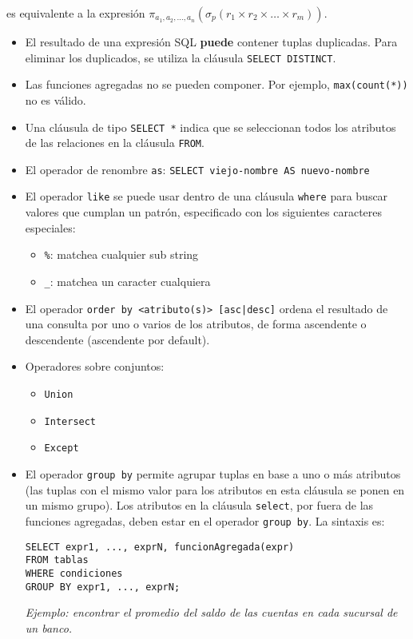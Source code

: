 \documentclass[a4paper, twoside]{article}
\begin{document}
es equivalente a la expresión $\pi_{a_{1},a_{2},\dots,a_{n}}\left(\sigma_{p}\left(r_{1}\times r_{2}\times\dots\times r_{m}\right)\right)$.
\begin{itemize}
	\item El resultado de una expresión SQL \textbf{puede} contener tuplas duplicadas. Para eliminar los duplicados, se utiliza la cláusula \texttt{SELECT DISTINCT}.
	\item Las funciones agregadas no se pueden componer. Por ejemplo, \texttt{max(count({*}))} no es válido.
	\item Una cláusula de tipo \texttt{SELECT {*}} indica que se seleccionan todos los atributos de las relaciones en la cláusula \texttt{FROM}.
	\item El operador de renombre \texttt{as}: \texttt{SELECT viejo-nombre AS nuevo-nombre}
	\item El operador \texttt{like} se puede usar dentro de una cláusula \texttt{where} para buscar valores que cumplan un patrón, especificado con los siguientes caracteres especiales: 
	\begin{itemize}
		\item \texttt{\%}: matchea cualquier sub string
		\item \texttt{\_}: matchea un caracter cualquiera
	\end{itemize}
	\item El operador \texttt{order by <atributo(s)> {[}asc|desc{]}} ordena el resultado de una consulta por uno o varios de los atributos, de forma ascendente o descendente (ascendente por default).
	\item Operadores sobre conjuntos:
	\begin{itemize}
		\item \texttt{Union}
		\item \texttt{Intersect}
		\item \texttt{Except}
	\end{itemize}
	\item El operador \texttt{group by} permite agrupar tuplas en base a uno o más atributos (las tuplas con el mismo valor para los atributos en esta cláusula se ponen en un mismo grupo). Los atributos en la cláusula \texttt{select}, por fuera de las funciones agregadas, deben estar en el operador \texttt{group by}. La sintaxis es:
	\begin{lstlisting}
SELECT expr1, ..., exprN, funcionAgregada(expr)
FROM tablas
WHERE condiciones
GROUP BY expr1, ..., exprN;
	\end{lstlisting}
	\emph{Ejemplo: encontrar el promedio del saldo de las cuentas en cada sucursal de un banco.}

\end{itemize}
\end{document}
